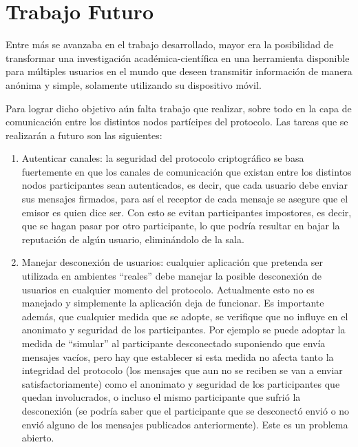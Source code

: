 \chapter{Trabajo Futuro}\label{cap6}

Entre más se avanzaba en el trabajo desarrollado, mayor era la posibilidad de 
transformar una investigación académica-científica en una herramienta 
disponible para múltiples usuarios en el mundo que deseen transmitir 
información de manera anónima y simple, solamente utilizando su dispositivo móvil.

Para lograr dicho objetivo aún falta trabajo que realizar, sobre todo en la 
capa de comunicación entre los distintos nodos partícipes del protocolo. Las 
tareas que se realizarán a futuro son las siguientes:

\begin{enumerate}
    \item Autenticar canales: la seguridad del protocolo criptográfico se basa 
    fuertemente en que los canales de comunicación que existan entre los 
    distintos nodos participantes sean autenticados, es decir, que cada 
    usuario debe enviar sus mensajes firmados, para así el receptor de cada 
    mensaje se asegure que el emisor es quien dice ser. Con esto se evitan 
    participantes impostores, es decir, que se hagan pasar por otro 
    participante, lo que podría resultar en bajar la reputación de algún 
    usuario, eliminándolo de la sala.
    
    \item Manejar desconexión de usuarios: cualquier aplicación que pretenda 
    ser utilizada en ambientes ``reales'' debe manejar la posible desconexión 
    de usuarios en cualquier momento del protocolo. Actualmente esto no es 
    manejado y simplemente la aplicación deja de funcionar. Es importante 
    además, que cualquier medida que se adopte, se verifique que no influye en 
    el anonimato y seguridad de los participantes. Por ejemplo se puede 
    adoptar la medida de ``simular'' al participante desconectado suponiendo 
    que envía mensajes vacíos, pero hay que establecer si esta medida no 
    afecta tanto la integridad del protocolo (los mensajes que aun no se 
    reciben se van a enviar satisfactoriamente) como el anonimato y seguridad 
    de los participantes que quedan involucrados, o incluso el mismo 
    participante que sufrió la desconexión (se podría saber que el 
    participante que se desconectó envió o no envió alguno de los mensajes 
    publicados anteriormente). Este es un problema abierto.
    

\end{enumerate}

